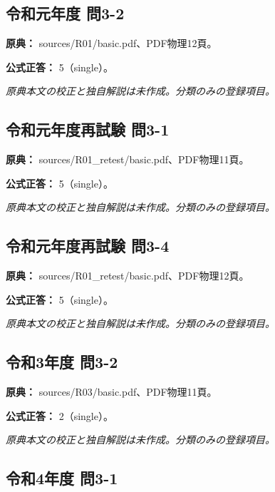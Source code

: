 \subsection{令和元年度 問3-2}
\label{q:r01-reg-basic-3-2}

\noindent\textbf{原典：} sources/R01/basic.pdf、PDF物理12頁。

\textbf{公式正答：} 5（single）。

\par\textit{原典本文の校正と独自解説は未作成。分類のみの登録項目。}

\subsection{令和元年度再試験 問3-1}
\label{q:r01-ret-basic-3-1}

\noindent\textbf{原典：} sources/R01\_retest/basic.pdf、PDF物理11頁。

\textbf{公式正答：} 5（single）。

\par\textit{原典本文の校正と独自解説は未作成。分類のみの登録項目。}

\subsection{令和元年度再試験 問3-4}
\label{q:r01-ret-basic-3-4}

\noindent\textbf{原典：} sources/R01\_retest/basic.pdf、PDF物理12頁。

\textbf{公式正答：} 5（single）。

\par\textit{原典本文の校正と独自解説は未作成。分類のみの登録項目。}

\subsection{令和3年度 問3-2}
\label{q:r03-reg-basic-3-2}

\noindent\textbf{原典：} sources/R03/basic.pdf、PDF物理11頁。

\textbf{公式正答：} 2（single）。

\par\textit{原典本文の校正と独自解説は未作成。分類のみの登録項目。}

\subsection{令和4年度 問3-1}
\label{q:r04-reg-basic-3-1}

